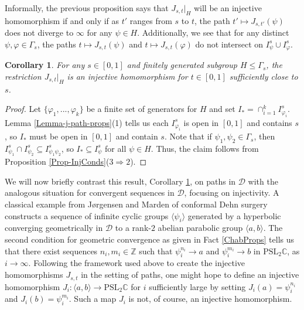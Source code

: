 \documentclass[11pt,leqno]{article}
\newtheorem{cor}[lemma]{Corollary}
\theoremstyle{introdef}
\numberwithin{lemma}{section}
\theoremstyle{definition}
\newcommand{\Z}{\mathbb{Z}}
\newcommand{\C}{\mathbb{C}}
\begin{document}
Informally, the previous proposition says that $J_{s,t}|_H$ will be an injective homomorphism if and only if as $t'$ ranges from $s$ to $t$, the path $t'\mapsto J_{s,t'}(\psi)$ does not diverge to $\infty$ for any $\psi\in H$. Additionally, we see that for any distinct $\psi,\varphi\in\Gamma_s$, the paths $t\mapsto J_{s,t}(\psi)$ and $t\mapsto J_{s,t}(\varphi)$ do not intersect on $I_\psi^s\cup I_\varphi^s$. \par

\begin{cor}
    \label{injhomo}
    For any $s\in[0,1]$ and finitely generated subgroup $H\leq\Gamma_s$, the restriction $J_{s,t}|_{H}$ is an injective homomorphism for $t\in[0,1]$ sufficiently close to $s$.
\end{cor}

\begin{proof}
    Let $\{\varphi_1,...,\varphi_k\}$ be a finite set of generators for $H$ and set $I_*=\cap_{i=1}^k I_{\varphi_i}^s$. Lemma \ref{Lemma-j-path-props}(1) tells us each $I_{\varphi_i}^s$ is open in $[0,1]$ and contains $s$, so $I_*$ must be open in $[0,1]$ and contain $s$. Note that if $\psi_1,\psi_2\in \Gamma_s$, then $I_{\psi_1}^s\cap I_{\psi_2}^s\subseteq I_{\psi_1\psi_2}^s$, so $I_*\subseteq I_\psi^s$ for all $\psi\in H$. Thus, the claim follows from Proposition \ref{Prop-InjConds}($3\Rightarrow 2$).
\end{proof}

We will now briefly contrast this result, Corollary \ref{injhomo}, on paths in $\mathcal{D}$ with the analogous situation for convergent sequences in $\mathcal{D}$, focusing on injectivity. A classical example from J{\o}rgensen and Marden \cite{JORMAR} of conformal Dehn surgery constructs a sequence of infinite cyclic groups $\langle\psi_i\rangle$ generated by a hyperbolic converging geometrically in $\mathcal{D}$ to a rank-$2$ abelian parabolic group $\langle a,b\rangle$. The second condition for geometric convergence as given in Fact \ref{ChabProps} tells us that there exist sequences $n_i,m_i\in\Z$ such that $\psi_i^{n_i}\rightarrow a$ and $\psi_i^{m_i}\rightarrow b$ in $\mathrm{PSL}_2\C$, as $i\rightarrow\infty$. Following the framework used above to create the injective homomorphisms $J_{s,t}$ in the setting of paths, one might hope to define an injective homomorphism $J_i:\langle a,b\rangle\rightarrow\mathrm{PSL}_2\C$ for $i$ sufficiently large by setting $J_i(a)=\psi_i^{n_i}$ and $J_i(b)=\psi_i^{m_i}$. Such a map $J_i$ is not, of course, an injective homomorphism.
\end{document}

